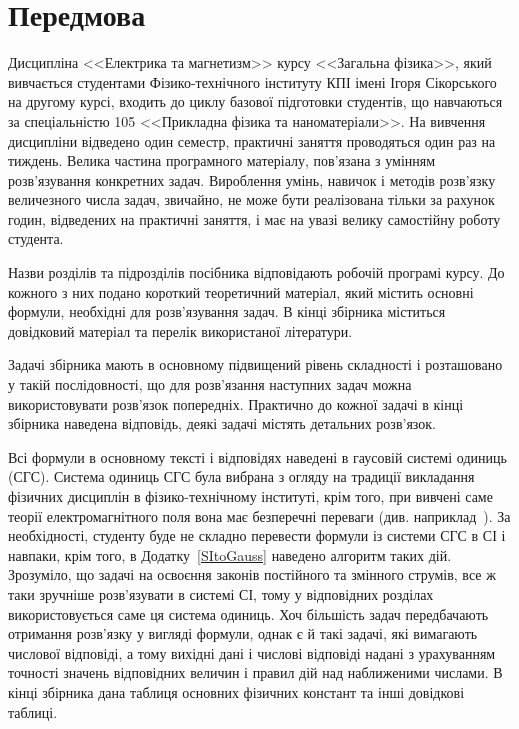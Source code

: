
\introtrue
\chapter*{Передмова}

Дисципліна <<Електрика та магнетизм>> курсу <<Загальна фізика>>, який вивчається студентами Фізико-технічного інституту КПІ імені Ігоря Сікорського на другому курсі, входить до циклу базової підготовки студентів, що навчаються за спеціальністю 105 <<Прикладна фізика та наноматеріали>>. На вивчення дисципліни відведено один семестр, практичні заняття проводяться один раз на тиждень. Велика частина програмного матеріалу, пов'язана з умінням розв'язування конкретних задач. Вироблення умінь, навичок і методів розв'язку величезного числа задач, звичайно, не може бути реалізована тільки за рахунок годин, відведених на практичні заняття, і має на увазі велику самостійну роботу студента.

Назви розділів та підрозділів посібника відповідають робочій програмі курсу. До кожного з них подано короткий теоретичний матеріал, який містить основні формули, необхідні для розв'язування задач. В кінці збірника міститься довідковий матеріал та перелік використаної літератури. 

Задачі збірника мають в основному підвищений рівень складності і розташовано у такій послідовності, що для розв'язання наступних задач можна використовувати розв'язок попередніх. Практично до кожної задачі  в кінці збірника наведена відповідь, деякі задачі містять детальних розв'язок. 

Всі формули в основному тексті і відповідях наведені в гаусовій системі одиниць (СГС). Система одиниць СГС була вибрана з огляду на традиції викладання фізичних дисциплін в фізико-технічному інституті, крім того, при вивчені саме теорії електромагнітного поля вона має безперечні переваги (див. наприклад~\cite[\S85]{Siv3}). За необхідності, студенту буде не складно перевести формули із системи СГС в СІ і навпаки, крім того, в Додатку~\ref{SItoGauss} наведено алгоритм таких дій. Зрозуміло, що задачі на освоєння законів постійного та змінного струмів, все ж таки зручніше розв'язувати в системі СІ, тому у відповідних розділах використовується саме ця система одиниць. Хоч більшість задач передбачають отримання розв'язку у вигляді формули, однак є й такі задачі, які вимагають числової відповіді, а тому вихідні дані і числові відповіді надані з урахуванням точності значень відповідних величин і правил дій над наближеними числами. В кінці збірника дана таблиця основних фізичних констант та інші довідкові таблиці.

